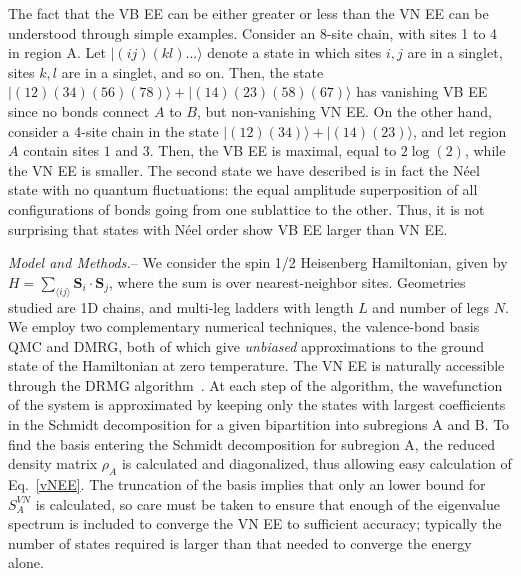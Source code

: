 \documentclass[prl,aps,twocolumn,floatfix,amsmath,amssymb,superscriptaddress,tightenlines]{revtex4}
\begin{document}
The fact  that the VB EE can be either greater or less than the VN EE can be understood through simple
examples.  Consider an 8-site chain, with sites 1 to 4 in region A.  Let
$|(ij)(kl)...\rangle$ denote a state in which sites $i,j$ are in a singlet, sites $k,l$ are in a singlet, and so on.
Then, the state $|(12)(34)(56)(78)\rangle+|(14)(23)(58)(67)\rangle$ has vanishing VB EE since
no bonds connect $A$ to $B$, but non-vanishing VN EE.  
On the other hand, consider a 4-site chain in
the state $|(12)(34)\rangle+|(14)(23)\rangle$, and let region $A$ contain sites $1$ and $3$.  Then, the VB EE is maximal,
equal to $2\log(2)$, while the VN EE is smaller.  The second state we have
described is in fact the N\'eel state with no
quantum fluctuations: the equal amplitude superposition of all configurations of bonds going from one sublattice to the other.
Thus, it is not surprising that states with N\'eel order show VB EE larger than VN EE.

{\it Model and Methods.}-- We consider the spin 1/2 Heisenberg
Hamiltonian, given by  $H =  \sum_{\langle i j \rangle} {\mathbf S}_i
\cdot {\mathbf S}_j \label{ham}$, where the sum is over nearest-neighbor
sites.  Geometries studied are 1D chains, and multi-leg ladders with
length $L$ and number of legs $N$.  
We employ two complementary numerical techniques, the valence-bond basis QMC and DMRG, both of
which give {\it unbiased} approximations to the ground state of the
Hamiltonian at zero temperature.  The VN EE is naturally accessible
through the DRMG 
algorithm~\cite{White92, Scholl05}.  At each
step of the algorithm, the wavefunction of the system is approximated by
keeping only the states with largest coefficients in the Schmidt
decomposition for a given bipartition into subregions A and B. To find the
basis entering the Schmidt decomposition for subregion A, the reduced
density matrix $\rho_A$ is calculated and diagonalized, thus allowing easy
calculation of Eq.~\eqref{vNEE}. The truncation of the basis implies that
only an lower bound for $S^{VN}_{A}$ is calculated, so care must be taken
to ensure that enough of the eigenvalue spectrum is included to converge
the VN EE to sufficient accuracy; typically the number of states required
is larger than that needed to converge the energy alone.
\end{document}
